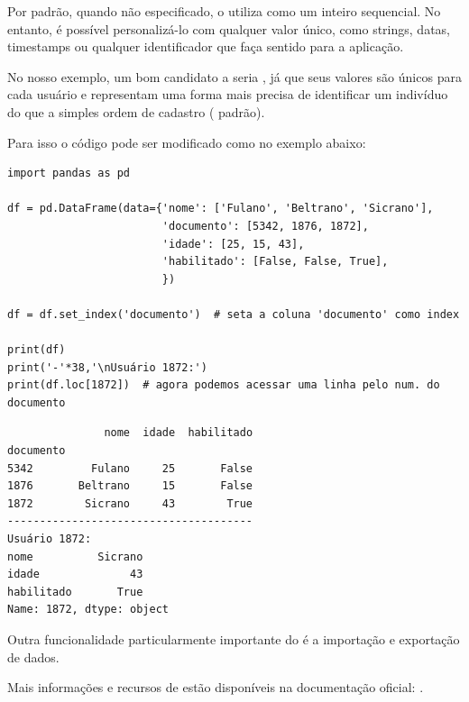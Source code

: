 Por padrão, quando não especificado, o  utiliza como  um inteiro sequencial.
No entanto, é possível personalizá-lo com qualquer valor único, como strings, datas, timestamps ou qualquer identificador que
faça sentido para a aplicação.

No nosso exemplo, um bom candidato a  seria , já que seus valores são únicos para
cada usuário e representam uma forma mais precisa de identificar um indivíduo do que a simples ordem de
cadastro ( padrão).

Para isso o código pode ser modificado como no exemplo abaixo:
\begin{verbatim}
import pandas as pd

df = pd.DataFrame(data={'nome': ['Fulano', 'Beltrano', 'Sicrano'],
                        'documento': [5342, 1876, 1872],
                        'idade': [25, 15, 43],
                        'habilitado': [False, False, True],
                        })

df = df.set_index('documento')  # seta a coluna 'documento' como index

print(df)
print('-'*38,'\nUsuário 1872:')
print(df.loc[1872])  # agora podemos acessar uma linha pelo num. do documento
\end{verbatim}
\begin{verbatim}
               nome  idade  habilitado
documento
5342         Fulano     25       False
1876       Beltrano     15       False
1872        Sicrano     43        True
--------------------------------------
Usuário 1872:
nome          Sicrano
idade              43
habilitado       True
Name: 1872, dtype: object
\end{verbatim}

Outra funcionalidade particularmente importante do  é a importação e exportação de dados.






Mais informações e recursos de  estão disponíveis na documentação oficial:
.
